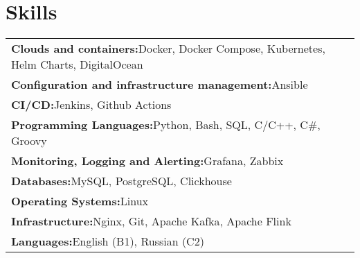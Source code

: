 \documentclass[a4paper,12pt]{article}
\begin{document}
    \section{Skills}
    \renewcommand{\arraystretch}{1.1}
    \begin{tabularx}{\linewidth}{@{}l X@{}}
        \textbf{Clouds and containers:}\quad Docker, \quad Docker Compose, \quad Kubernetes, \quad Helm Charts, \quad DigitalOcean \\
        \textbf{Configuration and infrastructure management:}\quad Ansible \\
        \textbf{CI/CD:}\quad Jenkins, \quad Github Actions \\
        \textbf{Programming Languages:}\quad Python, \quad Bash, \quad SQL, \quad C/C++, \quad C\#, \quad Groovy \\
        \textbf{Monitoring, Logging and Alerting:}\quad Grafana, \quad Zabbix \\
        \textbf{Databases:}\quad MySQL, \quad PostgreSQL, \quad Clickhouse \\
        \textbf{Operating Systems:}\quad Linux \\
        \textbf{Infrastructure:}\quad Nginx, \quad Git, \quad Apache Kafka, \quad Apache Flink \\
        \textbf{Languages:}\quad English (B1), \quad Russian (C2) \\
    \end{tabularx}
\end{document}
